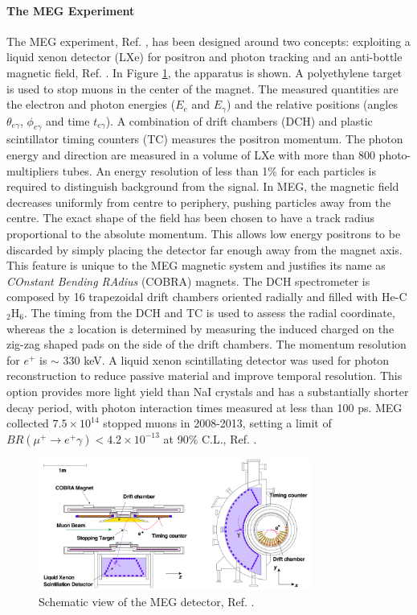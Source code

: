 \paragraph{The MEG Experiment}
The MEG experiment, Ref. \cite{megi}, has been designed around two concepts: exploiting a liquid
xenon detector (LXe) for positron and photon tracking and an anti-bottle magnetic field, Ref. \cite{clfv_signorelli}. 
In Figure \ref{fig:meg}, the apparatus is shown. A polyethylene target is used to stop muons in the center of the magnet. 
The measured quantities are the electron and photon energies ($E_e$ and $E_\gamma$) and the
relative positions (angles $\theta_{e\gamma}$, $\phi_{e\gamma}$ and time $t_{e \gamma}$).
A combination of drift chambers (DCH) and plastic scintillator timing counters (TC) measures the positron momentum.
The photon energy and direction are measured in a volume of LXe with more than 800 photo-multipliers tubes. 
An energy resolution of less than 1\% for each particles is required to distinguish background from the signal. 
In MEG, the magnetic field decreases uniformly from centre to periphery, pushing particles away from the centre. 
The exact shape of the field has been chosen to have a track radius proportional to the absolute momentum.
This allows low energy positrons to be discarded by simply placing the detector far enough away from the magnet axis. 
This feature is unique to the MEG magnetic system and justifies its name as \textit{COnstant Bending RAdius} (COBRA) magnets.
The DCH spectrometer is composed by 16 trapezoidal drift chambers oriented radially and filled with He-C$_2$H$_6$. 
The timing from the DCH and TC is used to assess the radial coordinate, whereas the $z$ location is determined by measuring the induced
charged on the zig-zag shaped pads on the side of the drift chambers. The momentum resolution for $e^+$ is $\sim$ 330 keV.
A liquid xenon scintillating detector was used for photon reconstruction to reduce passive material and improve temporal resolution. 
This option provides more light yield than NaI crystals and has a substantially shorter decay period, with photon interaction times measured at less than 100 ps.
MEG collected $7.5 \times 10^{14}$ stopped muons in 2008-2013, setting a limit of $BR(\mu^+ \rightarrow e^+ \gamma) < 4.2 \times 10^{-13}$ at 90\% C.L., Ref. \cite{megi}.
\begin{figure}[!h]
\centering
\includegraphics[width =0.8\textwidth]{figures/png/Screenshot_20240321_115127.png}
\caption{Schematic view of the MEG detector, Ref. \cite{megi}.}
\label{fig:meg}
\end{figure}
